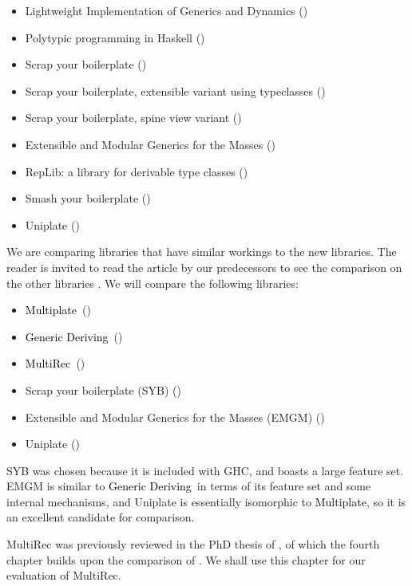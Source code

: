\documentclass[twocolumn,11pt,a4paper]{article}
\newcommand{\multiplate}{\textcolor{black}{Multiplate}}
\newcommand{\genericderiving}{\textcolor{black}{Generic Deriving}}
\newcommand{\multirec}{\textcolor{black}{MultiRec}}
\newcommand{\citept}[1]{(\citet{#1})}
\begin{document}
\begin{itemize}
\item Lightweight Implementation of Generics and Dynamics \citept{ligd:2002:lib} 
\item Polytypic programming in Haskell \citept{polylib:2004:lib}
\item Scrap your boilerplate \citept{syb:2003:lib}
\item Scrap your boilerplate, extensible variant using typeclasses \citept{syb3:2005:lib}
\item Scrap your boilerplate, spine view variant \citept{spine:2006:lib}
\item Extensible and Modular Generics for the Masses \citept{emgm:2006:lib}
\item RepLib: a library for derivable type classes \citept{replib:2006:lib}
\item Smash your boilerplate \citept{smash:2006:lib}
\item Uniplate \citept{uniplate:2007:lib}
\end{itemize}

We are comparing libraries that have similar workings to the new libraries. The reader is invited to read the article by our predecessors to see the comparison on the other libraries \cite{Rodriguez:2008:art}. We will compare the following libraries:

\begin{itemize}
\item \multiplate\ \citept{multiplate:2011:lib}
\item \genericderiving\ \citept{generic-deriving:2010:lib}
\item \multirec\ \citept{multirec:2009:lib}
\item Scrap your boilerplate (SYB) \citept{syb:2003:lib}
\item Extensible and Modular Generics for the Masses (EMGM) \citept{emgm:2006:lib}
\item Uniplate \citept{uniplate:2007:lib}
\end{itemize}

SYB was chosen because it is included with GHC, and boasts a large feature set. EMGM is similar to \genericderiving\ in terms of its feature set and some internal mechanisms, and Uniplate is essentially isomorphic to \multiplate, so it is an excellent candidate for comparison.

MultiRec was previously reviewed in the PhD thesis of \citet{Rodriguez:2009:phd}, of which the fourth chapter builds upon the comparison of \citet{Rodriguez:2008:art}. We shall use this chapter for our evaluation of MultiRec.
\end{document}
